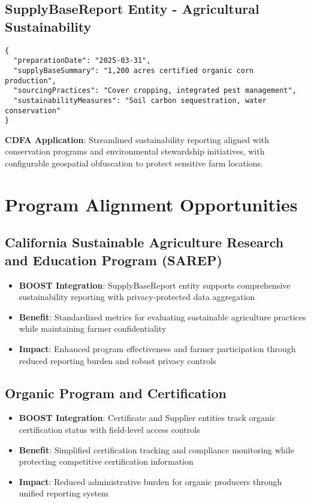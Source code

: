 \documentclass[title=small,preset=opensansnote,par=skip]{article}
\begin{document}
\subsection{SupplyBaseReport Entity - Agricultural Sustainability}
\label{sec:org16c31d8}
\begin{verbatim}
{
  "preparationDate": "2025-03-31",
  "supplyBaseSummary": "1,200 acres certified organic corn production",
  "sourcingPractices": "Cover cropping, integrated pest management",
  "sustainabilityMeasures": "Soil carbon sequestration, water conservation"
}
\end{verbatim}
\textbf{CDFA Application}: Streamlined sustainability reporting aligned with conservation programs and environmental stewardship initiatives, with configurable geospatial obfuscation to protect sensitive farm locations.
\section{Program Alignment Opportunities}
\label{sec:org5443d12}

\subsection{California Sustainable Agriculture Research and Education Program (SAREP)}
\label{sec:org43b1b55}
\begin{itemize}
\item \textbf{BOOST Integration}: SupplyBaseReport entity supports comprehensive sustainability reporting with privacy-protected data aggregation
\item \textbf{Benefit}: Standardized metrics for evaluating sustainable agriculture practices while maintaining farmer confidentiality
\item \textbf{Impact}: Enhanced program effectiveness and farmer participation through reduced reporting burden and robust privacy controls
\end{itemize}
\subsection{Organic Program and Certification}
\label{sec:org85f1759}
\begin{itemize}
\item \textbf{BOOST Integration}: Certificate and Supplier entities track organic certification status with field-level access controls
\item \textbf{Benefit}: Simplified certification tracking and compliance monitoring while protecting competitive certification information
\item \textbf{Impact}: Reduced administrative burden for organic producers through unified reporting system
\end{itemize}
\end{document}
